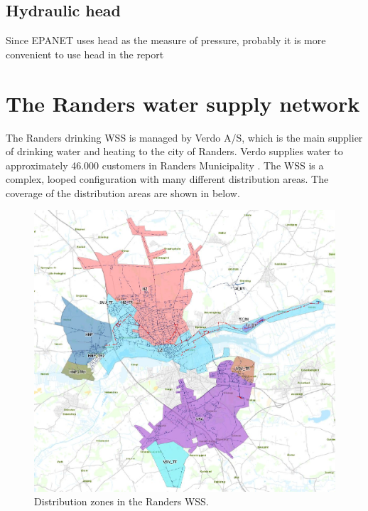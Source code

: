 \subsection{Hydraulic head}
\label{hydraulic_head}
Since EPANET uses head as the measure of pressure, probably it is more convenient to use head in the report

\newpage

\section{The Randers water supply network}
\label{the_randers_water_supply_network}

The Randers drinking WSS is managed by Verdo A/S, which is the main supplier of drinking water and heating to the city of Randers. Verdo supplies water to approximately 46.000 customers in Randers Municipality \cite{verdo}. The WSS is a complex, looped configuration with many different distribution areas. The coverage of the distribution areas are shown in  below.

\begin{figure}[H]
\centering
\includegraphics[width=1\textwidth]{report/pictures/level_zones}
\caption{Distribution zones in the Randers WSS.}
\label{fig:level_zones}
\end{figure}

